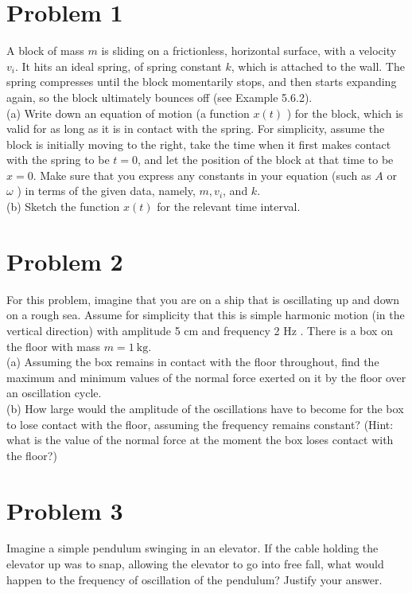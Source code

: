 \documentclass[10pt]{article}
\begin{document}
\section*{Problem 1}
A block of mass $m$ is sliding on a frictionless, horizontal surface, with a velocity $v_{i}$. It hits an ideal spring, of spring constant $k$, which is attached to the wall. The spring compresses until the block momentarily stops, and then starts expanding again, so the block ultimately bounces off (see Example 5.6.2).\\
(a) Write down an equation of motion (a function $x(t)$ ) for the block, which is valid for as long as it is in contact with the spring. For simplicity, assume the block is initially moving to the right, take the time when it first makes contact with the spring to be $t=0$, and let the position of the block at that time to be $x=0$. Make sure that you express any constants in your equation (such as $A$ or $\omega$ ) in terms of the given data, namely, $m, v_{i}$, and $k$.\\
(b) Sketch the function $x(t)$ for the relevant time interval.

\section*{Problem 2}
For this problem, imagine that you are on a ship that is oscillating up and down on a rough sea. Assume for simplicity that this is simple harmonic motion (in the vertical direction) with amplitude 5 cm and frequency 2 Hz . There is a box on the floor with mass $m=1 \mathrm{~kg}$.\\
(a) Assuming the box remains in contact with the floor throughout, find the maximum and minimum values of the normal force exerted on it by the floor over an oscillation cycle.\\
(b) How large would the amplitude of the oscillations have to become for the box to lose contact with the floor, assuming the frequency remains constant? (Hint: what is the value of the normal force at the moment the box loses contact with the floor?)

\section*{Problem 3}
Imagine a simple pendulum swinging in an elevator. If the cable holding the elevator up was to snap, allowing the elevator to go into free fall, what would happen to the frequency of oscillation of the pendulum? Justify your answer.
\end{document}
